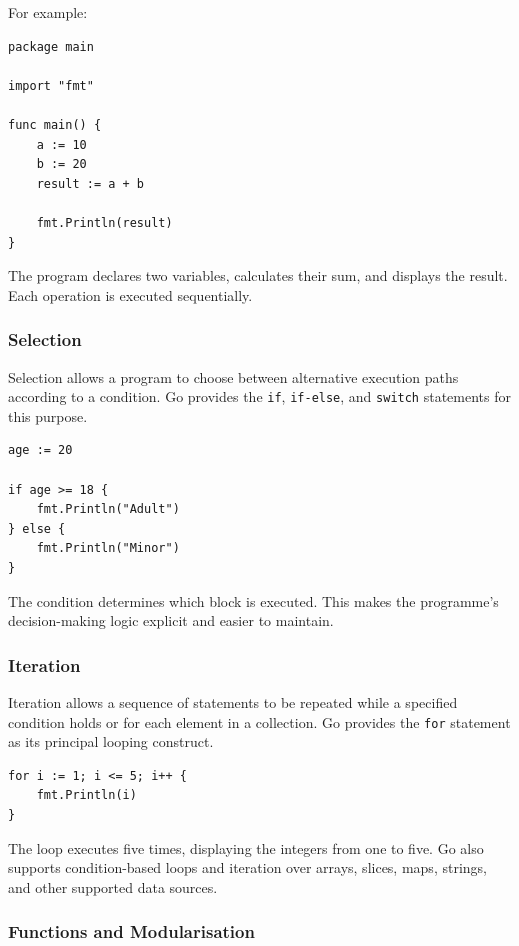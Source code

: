 For example:

\begin{lstlisting}
package main

import "fmt"

func main() {
    a := 10
    b := 20
    result := a + b

    fmt.Println(result)
}
\end{lstlisting}

The program declares two variables, calculates their sum, and displays the result. Each operation is executed sequentially.

\subsubsection{Selection}

Selection allows a program to choose between alternative execution paths according to a condition. Go provides the \texttt{if}, \texttt{if-else}, and \texttt{switch} statements for this purpose.

\begin{lstlisting}
age := 20

if age >= 18 {
    fmt.Println("Adult")
} else {
    fmt.Println("Minor")
}
\end{lstlisting}

The condition determines which block is executed. This makes the programme's decision-making logic explicit and easier to maintain.

\subsubsection{Iteration}

Iteration allows a sequence of statements to be repeated while a specified condition holds or for each element in a collection. Go provides the \texttt{for} statement as its principal looping construct.

\begin{lstlisting}
for i := 1; i <= 5; i++ {
    fmt.Println(i)
}
\end{lstlisting}

The loop executes five times, displaying the integers from one to five. Go also supports condition-based loops and iteration over arrays, slices, maps, strings, and other supported data sources.

\subsubsection{Functions and Modularisation}

